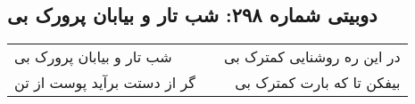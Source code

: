 \begin{center}
\section*{دوبیتی شماره ۲۹۸: شب تار و بیابان پرورک بی}
\label{sec:298}
\begin{longtable}{l p{0.5cm} r}
شب تار و بیابان پرورک بی
&&
در این ره روشنایی کمترک بی
\\
گر از دستت برآید پوست از تن
&&
بیفکن تا که بارت کمترک بی
\\
\end{longtable}
\end{center}
